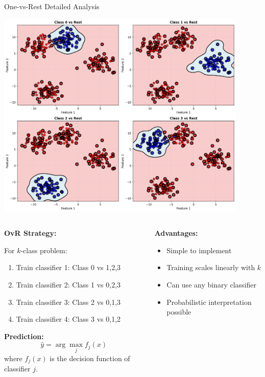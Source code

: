 \documentclass[8pt,aspectratio=1610]{beamer}
\begin{document}
\begin{frame}{One-vs-Rest Detailed Analysis}
\begin{center}
\includegraphics[width=0.9\textwidth]{../figures/ovr_detailed.png}
\end{center}

\begin{columns}[t]
\begin{column}{0.48\textwidth}
\textbf{OvR Strategy:}
\vspace{0.2cm}

For $k$-class problem:
\begin{enumerate}
\setlength{\itemsep}{1pt}
\item Train classifier 1: Class 0 vs {1,2,3}
\item Train classifier 2: Class 1 vs {0,2,3}
\item Train classifier 3: Class 2 vs {0,1,3}
\item Train classifier 4: Class 3 vs {0,1,2}
\end{enumerate}

\vspace{0.3cm}
\textbf{Prediction:}
$$\hat{y} = \arg\max_{j} f_j(x)$$
where $f_j(x)$ is the decision function of classifier $j$.
\end{column}

\begin{column}{0.48\textwidth}
\textbf{Advantages:}
\begin{itemize}
\setlength{\itemsep}{1pt}
\item Simple to implement
\item Training scales linearly with $k$
\item Can use any binary classifier
\item Probabilistic interpretation possible
\end{itemize}


\end{column}
\end{columns}
\end{frame}
\end{document}
